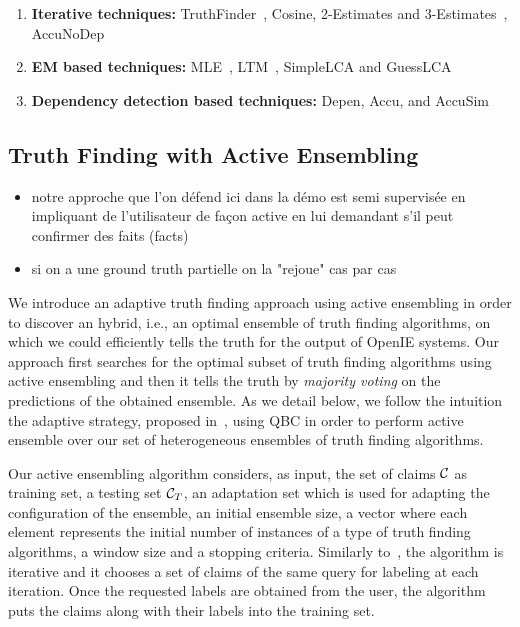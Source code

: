 \begin{enumerate}
 \item \textbf{Iterative techniques:} TruthFinder~\cite{YinHY08}, Cosine, 2-Estimates and 3-Estimates~\cite{GallandAMS10}, 
 AccuNoDep~\cite{DongBS09}
 \item \textbf{EM based techniques:} MLE~\cite{WangKLA12}, LTM~\cite{ZhaoRGH12}, SimpleLCA and GuessLCA~\cite{PasternackR13}
 \item \textbf{Dependency detection based techniques:} Depen, Accu, and AccuSim~\cite{DongBS09}
\end{enumerate}



\subsection{Truth Finding with Active Ensembling}
\begin{itemize}
 \item notre approche que l'on défend ici dans la démo est  semi supervisée en impliquant de l'utilisateur de façon active
en lui demandant s'il peut confirmer des faits (facts)
\item si on a une ground truth partielle on la "rejoue" cas par cas
\end{itemize}

\medskip

We introduce an adaptive truth finding approach using active ensembling in order to discover an hybrid, i.e., an optimal
ensemble of truth finding algorithms, on which we could efficiently tells the truth for the output of OpenIE systems.
Our approach first searches for the optimal subset of truth finding algorithms using active ensembling and then it 
tells the truth by \emph{majority voting} on the predictions of the obtained ensemble. As we detail below, we follow the intuition
the adaptive strategy, proposed in~\cite{Lu15}, using QBC in order to perform active ensemble over our set of heterogeneous 
ensembles of truth finding algorithms. 


Our active ensembling algorithm considers, as input, the set of claims $\mathcal{C}{}$ as training set, a testing set $\mathcal{C}_{T}$,
an adaptation set which is used for adapting the configuration of the ensemble, an initial ensemble size, a vector where each element
represents the initial number of instances of a type of truth finding algorithms, a window size and a stopping criteria. Similarly to~\cite{Lu15},
the algorithm is iterative and it chooses a set of claims of the same query for labeling at each iteration. Once the requested labels are obtained
from the user, the algorithm puts the claims along with their labels into the training set.


